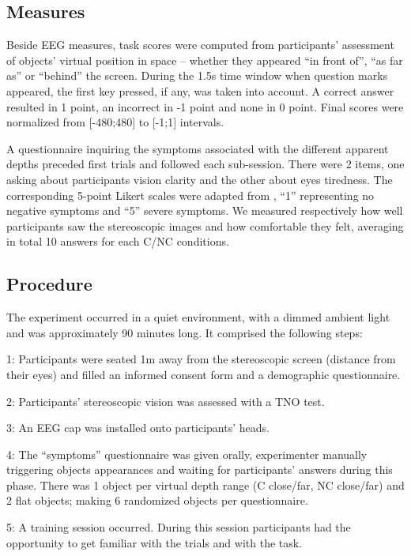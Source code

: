 \documentclass{template/llncs}
\begin{document}
\subsection{Measures}\label{measures}

Beside EEG measures, task scores were computed from participants' assessment of objects' virtual position in space -- whether they appeared ``in front of'', ``as far as'' or ``behind'' the screen. During the 1.5s time window when question marks appeared, the first key pressed, if any, was taken into account. A correct answer resulted in 1 point, an incorrect in -1 point and none in 0 point. Final scores were normalized from [-480;480] to [-1;1] intervals.

A questionnaire inquiring the symptoms associated with the different apparent depths preceded first trials and followed each sub-session. There were 2 items, one asking about participants vision clarity and the other about eyes tiredness. The corresponding 5-point Likert scales were adapted from \cite{Shibata2011}, ``1'' representing no negative symptoms and ``5'' severe symptoms. We measured respectively how well participants saw the stereoscopic images and how comfortable they felt, averaging in total 10 answers for each C/NC conditions.

\subsection{Procedure}\label{procedure}

The experiment occurred in a quiet environment, with a dimmed ambient light and was approximately 90 minutes long. It comprised the following steps: 

1: Participants were seated 1m away from the stereoscopic screen (distance from their eyes) and filled an informed consent form and a demographic questionnaire.

2: Participants' stereoscopic vision was assessed with a TNO test.

3: An EEG cap was installed onto participants' heads.

4: The ``symptoms'' questionnaire was given orally, experimenter manually triggering objects appearances and waiting for participants' answers during this phase. There was 1 object per virtual depth range (C close/far, NC close/far) and 2 flat objects; making 6 randomized objects per questionnaire.

5: A training session occurred. During this session participants had the opportunity to get familiar with the trials and with the task. 
\end{document}
